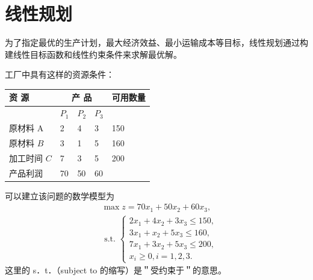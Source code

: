 \section{线性规划}

\begin{definition}
    为了指定最优的生产计划，最大经济效益、最小运输成本等目标，线性规划通过构建线性目标函数和线性约束条件来求解最优解。
\end{definition}

\begin{example}

    工厂中具有这样的资源条件：

    \begin{center}
        \begin{tabular}{|l|l|l|l|l|}
            \hline \multirow{2}{*}{资 源} & \multicolumn{3}{|c|}{产 品} & \multirow{2}{*}{可用数量}               \\
            \hline                      & $P_1$                     & $P_2$                 & $P_3$ &     \\
            \hline 原材料 A                & 2                         & 4                     & 3     & 150 \\
            \hline 原材料 $B$              & 3                         & 1                     & 5     & 160 \\
            \hline 加工时间 $C$             & 7                         & 3                     & 5     & 200 \\
            \hline 产品利润                 & 70                        & 50                    & 60    &     \\
            \hline
        \end{tabular}
    \end{center}
\end{example}

\begin{solution}
    可以建立该问题的数学模型为
    $$
        \begin{aligned}
             & \max z=70 x_1+50 x_2+60 x_3,                          \\
             & \text { s.t. }\left\{\begin{array}{l}
                                        2 x_1+4 x_2+3 x_3 \leqslant 150, \\
                                        3 x_1+x_2+5 x_3 \leqslant 160,   \\
                                        7 x_1+3 x_2+5 x_3 \leqslant 200, \\
                                        x_i \geqslant 0, i=1,2,3 .
                                    \end{array}\right.
        \end{aligned}
    $$
    这里的 s．t．（subject to 的缩写）是＂受约束于＂的意思。
\end{solution}

